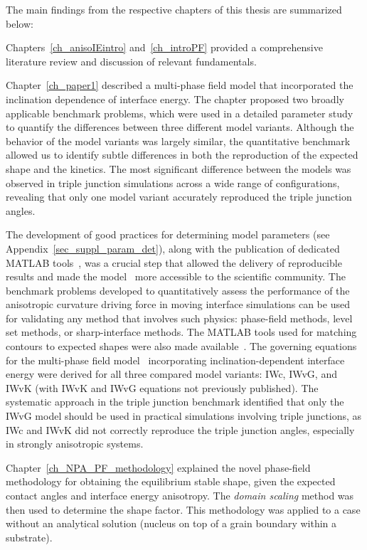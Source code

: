 The main findings from the respective chapters of this thesis are summarized below:

Chapters~\ref{ch_anisoIEintro} and~\ref{ch_introPF} provided a comprehensive literature review and discussion of relevant fundamentals.

Chapter~\ref{ch_paper1} described a multi-phase field model that incorporated the inclination dependence of interface energy. The chapter proposed two broadly applicable benchmark problems, which were used in a detailed parameter study to quantify the differences between three different model variants. Although the behavior of the model variants was largely similar, the quantitative benchmark allowed us to identify subtle differences in both the reproduction of the expected shape and the kinetics. The most significant difference between the models was observed in triple junction simulations across a wide range of configurations, revealing that only one model variant accurately reproduced the triple junction angles.

The development of good practices for determining model parameters (see Appendix~\ref{sec_suppl_param_det}), along with the publication of dedicated MATLAB tools~\cite{Minar2022dataset}, was a crucial step that allowed the delivery of reproducible results and made the model~\cite{Moelans2008} more accessible to the scientific community.
The benchmark problems developed to quantitatively assess the performance of the anisotropic curvature driving force in moving interface simulations can be used for validating any method that involves such physics: phase-field methods, level set methods, or sharp-interface methods. The MATLAB tools used for matching contours to expected shapes were also made available~\cite{Minar2022dataset}.
The governing equations for the multi-phase field model~\cite{Moelans2008} incorporating inclination-dependent interface energy were derived for all three compared model variants: IWc, IWvG, and IWvK (with IWvK and IWvG equations not previously published).
The systematic approach in the triple junction benchmark identified that only the IWvG model should be used in practical simulations involving triple junctions, as IWc and IWvK did not correctly reproduce the triple junction angles, especially in strongly anisotropic systems.

Chapter~\ref{ch_NPA_PF_methodology} explained the novel phase-field methodology for obtaining the equilibrium stable shape, given the expected contact angles and interface energy anisotropy. The \textit{domain scaling} method was then used to determine the shape factor. This methodology was applied to a case without an analytical solution (nucleus on top of a grain boundary within a substrate).

